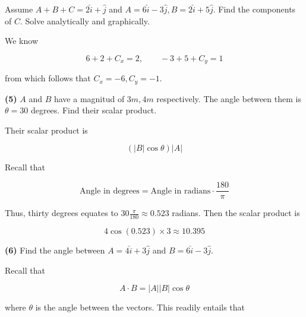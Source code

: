 \documentclass[12pt]{article}
\theoremstyle{definition}
\begin{document}
\pagebreak 

\begin{shaded}
    Assume $A + B + C = 2\hat{i} + \hat{j}$ and $A = 6\hat{i}-3\hat{j}, B =
    2\hat{i} + 5\hat{j}$. Find the components of $C$. Solve analytically and
    graphically.
\end{shaded}

We know 

\begin{equation*}
    6 + 2 + C_x = 2, \qquad -3 + 5 + C_y = 1
\end{equation*}

from which follows that $C_x = -6, C_y = -1$.

\pagebreak 

\begin{shaded}
    \textbf{(5)} $A$ and $B$ have a magnitud of $3m, 4m$ respectively. The angle between them
    is $\theta = 30$ degrees. Find their scalar product.
\end{shaded}

Their scalar product is 

\begin{equation*}
    ( \left| B \right|  \cos \theta ) \left| A \right| 
\end{equation*}

Recall that 

\begin{equation*}
    \text{Angle in degrees} = \text{Angle in radians} \cdot \frac{180}{\pi}
\end{equation*}

Thus, thirty degrees equates to $30 \frac{\pi}{180} \approx 0.523$ radians. Then
the scalar product is 

\begin{equation*}
    4 \cos (0.523) \times 3 \approx 10.395
\end{equation*}




\pagebreak 

\begin{shaded}
    \textbf{(6)} Find the angle between $A = 4 \hat{i} + 3 \hat{j}$ and 
    $B = 6\hat{i} - 3 \hat{j}$.
\end{shaded}

Recall that 

\begin{equation*}
    A \cdot B = \left| A \right| \left| B \right| \cos \theta
\end{equation*}

where $\theta$ is the angle between the vectors. This readily entails that 
\end{document}

